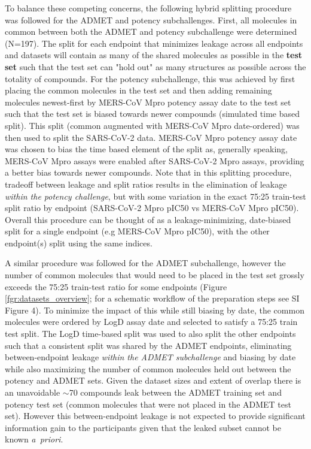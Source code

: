 \documentclass[journal=jcim,manuscript=article]{achemso}
\begin{document}
To balance these competing concerns, the following hybrid splitting procedure was followed for the ADMET and potency subchallenges. First, all molecules in common between both the ADMET and potency subchallenge were determined (N=197). The split for each endpoint that minimizes leakage across all endpoints and datasets will contain as many of the shared molecules as possible in the \textbf{test set} such that the test set can "hold out" as many structures as possible across the totality of compounds. For the potency subchallenge, this was achieved by first placing the common molecules in the test set and then adding remaining molecules newest-first by MERS-CoV Mpro potency assay date to the test set such that the test set is biased towards newer compounds (simulated time based split). This split (common augmented with MERS-CoV Mpro date-ordered) was then used to split the SARS-CoV-2 data. MERS-CoV Mpro potency assay date was chosen to bias the time based element of the split as, generally speaking, MERS-CoV Mpro assays were enabled after SARS-CoV-2 Mpro assays, providing a better bias towards newer compounds. Note that in this splitting procedure, tradeoff between leakage and split ratios results in the elimination of leakage \textit{within the potency challenge}, but with some variation in the exact 75:25 train-test split ratio by endpoint (SARS-CoV-2 Mpro pIC50 vs MERS-CoV Mpro pIC50). Overall this procedure can be thought of as a leakage-minimizing, date-biased split for a single endpoint (e.g MERS-CoV Mpro pIC50), with the other endpoint(s) split using the same indices.

A similar procedure was followed for the ADMET subchallenge, however the number of common molecules that would need to be placed in the test set grossly exceeds the 75:25 train-test ratio for some endpoints (Figure \ref{fgr:datasets_overview}; for a schematic workflow of the preparation steps see SI Figure 4). To minimize the impact of this while still biasing by date, the common molecules were ordered by LogD assay date and selected to satisfy a 75:25 train test split. The LogD time-based split was used to also split the other endpoints such that a consistent split was shared by the ADMET endpoints, eliminating between-endpoint leakage \textit{within the ADMET subchallenge} and biasing by date while also maximizing the number of common molecules held out between the potency and ADMET sets. Given the dataset sizes and extent of overlap there is an unavoidable $\sim$70 compounds leak between the ADMET training set and potency test set (common molecules that were not placed in the ADMET test set). However this between-endpoint leakage is not expected to provide significant information gain to the participants given that the leaked subset cannot be known \textit{a~priori}.
\end{document}
